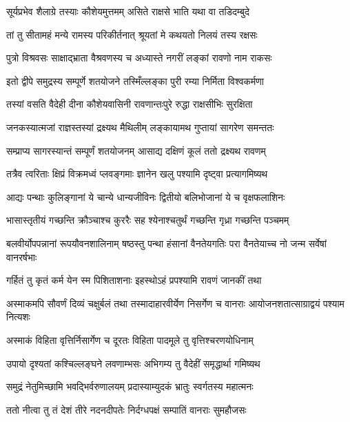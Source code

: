 \twolineshloka
{सूर्यप्रभेव शैलाग्रे तस्याः कौशेयमुत्तमम्}
{असिते राक्षसे भाति यथा वा तडिदम्बुदे} %

\twolineshloka
{तां तु सीतामहं मन्ये रामस्य परिकीर्तनात्}
{श्रूयतां मे कथयतो निलयं तस्य रक्षसः} %

\twolineshloka
{पुत्रो विश्रवसः साक्षाद्भ्राता वैश्रवणस्य च}
{अध्यास्ते नगरीं लङ्कां रावणो नाम राकसः} %

\twolineshloka
{इतो द्वीपे समुद्रस्य सम्पूर्णे शतयोजने}
{तस्मिँल्लङ्का पुरी रम्या निर्मिता विश्वकर्मणा} %

\twolineshloka
{तस्यां वसति वैदेही दीना कौशेयवासिनी}
{रावणान्तःपुरे रुद्धा राक्षसीभिः सुरक्षिता} %

\twolineshloka
{जनकस्यात्मजां राज्ञस्तस्यां द्रक्ष्यथ मैथिलीम्}
{लङ्कायामथ गुप्तायां सागरेण समन्ततः} %

\twolineshloka
{सम्प्राप्य सागरस्यान्तं सम्पूर्णं शतयोजनम्}
{आसाद्य दक्षिणं कूलं ततो द्रक्ष्यथ रावणम्} %

\twolineshloka
{तत्रैव त्वरिताः क्षिप्रं विक्रमध्वं प्लवङ्गमाः}
{ज्ञानेन खलु पश्यामि दृष्ट्वा प्रत्यागमिष्यथ} %

\twolineshloka
{आद्यः पन्थाः कुलिङ्गानां ये चान्ये धान्यजीविनः}
{द्वितीयो बलिभोजानां ये च वृक्षफलाशिनः} %

\twolineshloka
{भासास्तृतीयं गच्छन्ति क्रौञ्चाश्च कुररैः सह}
{श्येनाश्चतुर्थं गच्छन्ति गृध्रा गच्छन्ति पञ्चमम्} %

\threelineshloka
{बलवीर्योपपन्नानां रूपयौवनशालिनाम्}
{षष्ठस्तु पन्था हंसानां वैनतेयगतिः परा}
{वैनतेयाच्च नो जन्म सर्वेषां वानरर्षभाः} %

\twolineshloka
{गर्हितं तु कृतं कर्म येन स्म पिशिताशनाः}
{इहस्थोऽहं प्रपश्यामि रावणं जानकीं तथा} %

\threelineshloka
{अस्माकमपि सौवर्णं दिव्यं चक्षुर्बलं तथा}
{तस्मादाहारवीर्येण निसर्गेण च वानराः}
{आयोजनशतात्साग्राद्वयं पश्याम नित्यशः} %

\twolineshloka
{अस्माकं विहिता वृत्तिर्निसार्गेण च दूरतः}
{विहिता पादमूले तु वृत्तिश्चरणयोधिनाम्} %

\twolineshloka
{उपायो दृश्यतां कश्चिल्लङ्घने लवणाम्भसः}
{अभिगम्य तु वैदेहीं समृद्धार्था गमिष्यथ} %

\twolineshloka
{समुद्रं नेतुमिच्छामि भवद्भिर्वरुणालयम्}
{प्रदास्याम्युदकं भ्रातुः स्वर्गतस्य महात्मनः} %

\twolineshloka
{ततो नीत्वा तु तं देशं तीरे नदनदीपतेः}
{निर्दग्धपक्षं सम्पातिं वानराः सुमहौजसः} %

